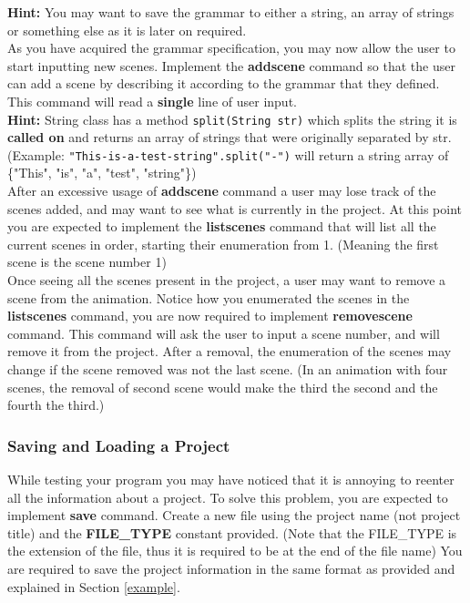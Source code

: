 \documentclass[a4paper]{article}
\begin{document}
	\noindent \textbf{Hint:} You may want to save the grammar to either a string, an array of strings or something else as it is later on required. \\
	
	As you have acquired the grammar specification, you may now allow the user to start inputting new scenes. Implement the \textbf{addscene} command so that the user can add a scene by describing it according to the grammar that they defined. This command will read a \textbf{single} line of user input. \\
	
	\noindent \textbf{Hint:} String class has a method \lstinline{split(String str)} which splits the string it is \textbf{called on} and returns an array of strings that were originally separated by str. (Example: \lstinline{"This-is-a-test-string".split("-")} will return a string array of \{"This", "is", "a", "test", "string"\}) \\
	
	After an excessive usage of \textbf{addscene} command a user may lose track of the scenes added, and may want to see what is currently in the project. At this point you are expected to implement the \textbf{listscenes} command that will list all the current scenes in order, starting their enumeration from 1. (Meaning the first scene is the scene number 1) \\
	
	Once seeing all the scenes present in the project, a user may want to remove a scene from the animation. Notice how you enumerated the scenes in the \textbf{listscenes} command, you are now required to implement \textbf{removescene} command. This command will ask the user to input a scene number, and will remove it from the project. After a removal, the enumeration of the scenes may change if the scene removed was not the last scene. (In an animation with four scenes, the removal of second scene would make the third the second and the fourth the third.) \\
	
	\subsubsection{Saving and Loading a Project}

	While testing your program you may have noticed that it is annoying to reenter all the information about a project. To solve this problem, you are expected to implement \textbf{save} command. Create a new file using the project name (not project title) and the \textbf{FILE\_TYPE} constant provided. (Note that the FILE\_TYPE is the extension of the file, thus it is required to be at the end of the file name) You are required to save the project information in the same format as provided and explained in Section \ref{example}. \\
	
\end{document}

